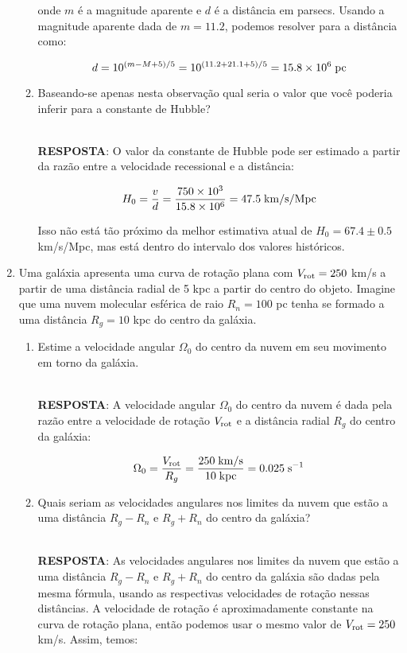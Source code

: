 \documentclass[a4paper,12pt]{article}
\begin{document}
\begin{enumerate}
\begin{enumerate}
onde $m$ é a magnitude aparente e $d$ é a distância em parsecs. Usando a magnitude aparente dada de $m = 11.2$, podemos resolver para a distância como:

$$d = 10^{(m - M + 5)/5} = 10^{(11.2 + 21.1 + 5)/5} = 15.8 \times 10^6 \; {\rm pc}$$

\noindent\hrulefill

\item Baseando-se apenas nesta observação qual seria o valor que você poderia inferir para a constante de Hubble?

\noindent\hrulefill\\\textbf{RESPOSTA}: O valor da constante de Hubble pode ser estimado a partir da razão entre a velocidade recessional e a distância:

$$H_0 = \frac{v}{d} = \frac{750 \times 10^3}{15.8 \times 10^6} = 47.5 \; {\rm km/s/Mpc}$$

Isso não está tão próximo da melhor estimativa atual de $H_0 = 67.4 \pm 0.5$ km/s/Mpc, mas está dentro do intervalo dos valores históricos.

\noindent\hrulefill

\end{enumerate}

\item Uma galáxia apresenta uma curva de rotação plana com $V_{\rm rot}=250$ km/s a 
partir de uma distância radial de 5 kpc a partir do centro do objeto. Imagine 
que uma nuvem molecular esférica de raio $R_n=100$ pc tenha se formado a 
uma distância $R_g=10$ kpc do centro da galáxia.

\begin{enumerate}
\item Estime a velocidade angular $\Omega_0$ do centro da nuvem em seu 
movimento em torno da galáxia.

\noindent\hrulefill\\\textbf{RESPOSTA}: A velocidade angular $\Omega_0$ do centro da nuvem é dada pela razão entre a velocidade de rotação $V_{\rm rot}$ e a distância radial $R_g$ do centro da galáxia:

$$\Omega_0 = \frac{V_{\rm rot}}{R_g} = \frac{250 \; {\rm km/s}}{10 \; {\rm kpc}} = 0.025 \; {\rm s^{-1}}$$

\noindent\hrulefill

\item Quais seriam as velocidades angulares nos limites da nuvem que estão 
a uma distância $R_g-R_n$ e $R_g+R_n$ do centro da galáxia?

\noindent\hrulefill\\\textbf{RESPOSTA}: As velocidades angulares nos limites da nuvem que estão a uma distância $R_g - R_n$ e $R_g + R_n$ do centro da galáxia são dadas pela mesma fórmula, usando as respectivas velocidades de rotação nessas distâncias. A velocidade de rotação é aproximadamente constante na curva de rotação plana, então podemos usar o mesmo valor de $V_{\rm rot} = 250$ km/s. Assim, temos:


\end{enumerate}
\end{enumerate}
\end{document}
